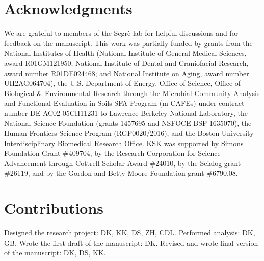 
\section*{Acknowledgments}

We are grateful to members of the Segrè lab for helpful discussions and for feedback on the manuscript. This work was partially funded by grants from the National Institutes of Health (National Institute of General Medical Sciences, award R01GM121950; National Institute of Dental and Craniofacial Research, award number R01DE024468; and National Institute on Aging, award number UH2AG064704), the U.S. Department of Energy, Office of Science, Office of Biological \& Environmental Research through the Microbial Community Analysis and Functional Evaluation in Soils SFA Program (m-CAFEs) under contract number DE-AC02-05CH11231 to Lawrence Berkeley National Laboratory, the National Science Foundation (grants 1457695 and NSFOCE-BSF 1635070), the Human Frontiers Science Program (RGP0020/2016), and the Boston University Interdisciplinary Biomedical Research Office.
KSK was supported by Simons Foundation Grant \#409704, by the Research Corporation for Science Advancement through Cottrell Scholar Award \#24010, by the Scialog grant \#26119, and by the Gordon and Betty Moore Foundation grant \#6790.08.

\section*{Contributions}
Designed the research project: DK, KK, DS, ZH, CDL. Performed analysis: DK, GB. Wrote the first draft of the manuscript: DK. Revised and wrote final version of the manuscript: DK, DS, KK.
